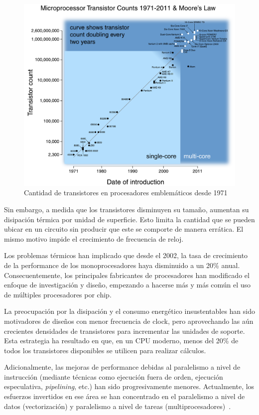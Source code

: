 \begin{figure}[htbp]
   \centering
   \includegraphics[width=\plotwidth]{images/moore-law.pdf}
   \caption{Cantidad de transistores en procesadores emblem\'aticos desde 1971}
   \label{moore-law}
\end{figure}

Sin embargo, a medida que los transistores disminuyen su tama\~no, aumentan su disipaci\'on t\'ermica por unidad de superficie.
Esto limita la cantidad que se pueden ubicar en un circuito sin producir que este se comporte de manera err\'atica.
El mismo motivo impide el crecimiento de frecuencia de reloj.

Los problemas t\'ermicos han implicado que desde el 2002, la tasa de crecimiento de la performance de los monoprocesadores haya disminuido a un 20\% anual.
Consecuentemente, los principales fabricantes de procesadores han modificado el enfoque de investigaci\'on y dise\~no, empezando a hacerse m\'as y m\'as com\'un el uso de m\'ultiples procesadores por chip.

La preocupaci\'on por la disipaci\'on y el consumo energ\'etico insustentables han sido motivadores de dise\~nos con menor frecuencia de clock, pero aprovechando las a\'un crecientes densidades de transistores para incrementar las unidades de soporte.
Esta estrategia ha resultado en que, en un CPU moderno, menos del 20\% de todos los transistores disponibles se utilicen para realizar c\'alculos.

Adicionalmente, las mejoras de performance debidas al paralelismo a nivel de instrucci\'on (mediante t\'ecnicas como ejecuci\'on fuera de orden, ejecuci\'on especulativa, \textit{pipelining}, etc.) han sido progresivamente menores.
Actualmente, los esfuerzos invertidos en ese \'area se han concentrado en el paralelismo a nivel de datos (vectorizaci\'on) y paralelismo a nivel de tareas (multiprocesadores)~\cite{HennessyPatterson}.

